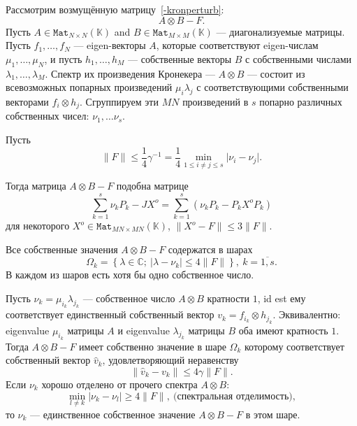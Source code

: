     Рассмотрим возмущённую матрицу~\eqref{-kronperturb}:
        \[
            A{\otimes}B - F.
        \]
    Пусть \( A\in\mathtt{Mat}_{N{\times}N}(\mathbb{K}) \) and \( B\in\mathtt{Mat}_{M{\times}M}(\mathbb{K}) \)
    --- диагонализуемые матрицы.
    Пусть \( f_1, \ldots, f_N \) --- eigen-векторы \( A \),
        которые соответствуют eigen-числам \( \mu_1, \ldots, \mu_N \),
        и пусть \( h_1, \ldots, h_M \) --- собственные векторы \( B \)
        с собственными числами \( \lambda_1, \ldots, \lambda_M \).
    Спектр их произведения Кронекера --- \( A{\otimes}B \) ---
        состоит из всевозможных попарных произведений \( \mu_i \lambda_j \)
        с соответствующими собственными векторами \( f_i\otimes h_j \).
    Сгруппируем эти \( MN \) произведений в \( s \) попарно различных
    собственных чисел:
        \( \nu_1, \ldots \nu_s \).

    Пусть
    \[
        \|F\| \leq \frac14 \gamma^{-1} = \frac14 \min_{1\leq i{\neq}j\leq s}\lvert\nu_i - \nu_j\rvert.
    \]

    Тогда матрица \( A{\otimes}B - F \) подобна матрице
    \[ \sum_{k=1}^s \nu_k P_k - JX^o = \sum_{k=1}^s (\nu_k P_k - P_k X^o P_k) \]
    для некоторого \( X^o \in \mathtt{Mat}_{MN{\times}MN}(\mathbb{K}) \),
    \( \|X^o - F\|\leq 3\|F\| \).

    Все собственные значения \( A{\otimes}B - F \) содержатся в шарах
    \[
        \Omega_k = \left\{
            \lambda\in\mathbb{C};
            \ \lvert\lambda - \nu_k\rvert \leq 4\|F\|
            \right\},
        \ k{=}\overline{1,s}.
    \]
    В каждом из шаров есть хотя бы одно собственное число.

    Пусть \( \nu_k=\mu_{i_k}\lambda_{j_k} \) --- собственное число \( A{\otimes}B \) кратности \( 1 \),
        id est ему соответствует единственный собственный вектор \( v_k = f_{i_k}{\otimes}h_{j_k} \).
    Эквивалентно: eigenvalue \( \mu_{i_k} \)
        матрицы \( A \) и eigenvalue \( \lambda_{j_k} \) матрицы \( B \)
        оба имеют кратность \( 1 \).
    Тогда \( A{\otimes}B - F \) имеет собственно значение в шаре \( \Omega_k \)
        которому соответствует собственный вектор \( \hat{v}_k \),
        удовлетворяющий неравенству
    \[
        \|\hat{v}_k - v_k\| \leq 4\gamma \|F\|.
    \]
    Если \( \nu_k \) хорошо отделено от прочего спектра \( A{\otimes}B \):
    \[
        \min_{l\neq k}
        \lvert
        \nu_k - \nu_l
        \rvert
        \geq 4\|F\|,\ \text{(спектральная отделимость)},
    \]
    то \( \nu_k \) --- единственное собственное значение \( A{\otimes}B - F \)
    в этом шаре.
